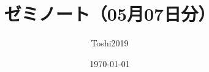 \newcommand{\cotn}[1][]{\dot{T}^{\ast}{#1}}


\newcommand{\muhom}{\mu hom}
\newcommand{\muHom}[1][]{\mathrm{Hom}^\mu_{\raise1.5ex\hbox to.1em{}#1}}

\newcommand{\mucat}[2][]{\mathsf{D}^{\mathrm{b}}_{#1}(#2)}

\newcommand{\conv}[1][]{\mathbin{\mathop{\circ}\limits_{#1}}}

\newcommand{\torus}{\mathbf{T}}

\newcommand{\diag}[1][]{\Delta_{#1}}



\title{ゼミノート（05月07日分）}
\author{Toshi2019}
\date{\today}

\maketitle
\tableofcontents
